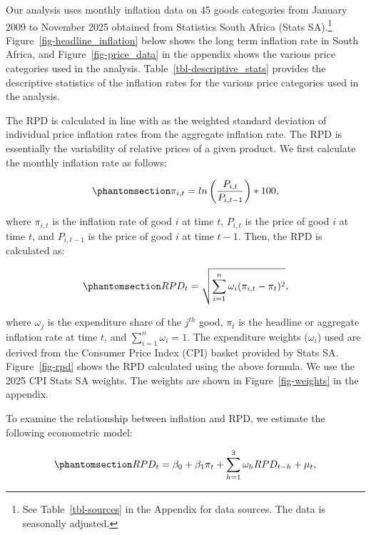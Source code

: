 \documentclass[
  letterpaper,
  DIV=11,
  numbers=noendperiod]{scrartcl}
\begin{document}
Our analysis uses monthly inflation data on 45 goods categories from
January 2009 to November 2025 obtained from Statistics South Africa
(Stats SA).\footnote{See Table~\ref{tbl-sources} in the Appendix for
  data sources. The data is seasonally adjusted.}
Figure~\ref{fig-headline_inflation} below shows the long term inflation
rate in South Africa, and Figure~\ref{fig-price_data} in the appendix
shows the various price categories used in the analysis.
Table~\ref{tbl-descriptive_stats} provides the descriptive statistics of
the inflation rates for the various price categories used in the
analysis.

The RPD is calculated in line with \citet{lach1992} as the weighted
standard deviation of individual price inflation rates from the
aggregate inflation rate. The RPD is essentially the variability of
relative prices of a given product. We first calculate the monthly
inflation rate as follows:

\begin{equation}\phantomsection\label{eq-inflation_rate}{ \pi_{i,t} = ln\left(\frac{P_{i,t}}{P_{i,t-1}}\right) * 100, }\end{equation}

where \(\pi_{i,t}\) is the inflation rate of good \(i\) at time \(t\),
\(P_{i,t}\) is the price of good \(i\) at time \(t\), and \(P_{i,t-1}\)
is the price of good \(i\) at time \(t-1\). Then, the RPD is calculated
as:

\begin{equation}\phantomsection\label{eq-rpd}{RPD_{t} = \sqrt{\sum_{i=1}^{n}\omega_{i}(\pi_{i,t} - \pi_{t})^2}, }\end{equation}

where \(\omega_{j}\) is the expenditure share of the \(j^{th}\) good,
\(\pi_{t}\) is the headline or aggregate inflation rate at time \(t\),
and \(\sum_{i=1}^{n}\omega_{i} = 1\). The expenditure weights
(\(\omega_{i}\)) used are derived from the Consumer Price Index (CPI)
basket provided by Stats SA. Figure~\ref{fig-rpd} shows the RPD
calculated using the above formula. We use the 2025 CPI Stats SA
weights. The weights are shown in Figure~\ref{fig-weights} in the
appendix.

To examine the relationship between inflation and RPD, we estimate the
following econometric model:

\begin{equation}\phantomsection\label{eq-rpd_reg}{RPD_{t} = \beta_0 + \beta_1\pi_{t} + \sum_{h=1}^{3}\omega_hRPD_{t-h}  +  \mu_{t}, }\end{equation}
\end{document}
